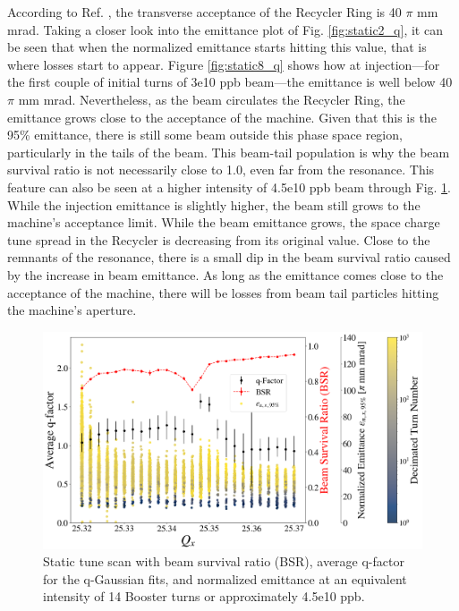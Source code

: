 According to Ref. \cite{rr0}, the transverse acceptance of the Recycler Ring is 40 $\pi$ mm mrad. Taking a closer look into the emittance plot of Fig. \ref{fig:static2_q}, it can be seen that when the normalized emittance starts hitting this value, that is where losses start to appear. Figure \ref{fig:static8_q} shows how at injection---for the first couple of initial turns of 3e10 ppb beam---the emittance is well below 40 $\pi$ mm mrad. Nevertheless, as the beam circulates the Recycler Ring, the emittance grows close to the acceptance of the machine. Given that this is the 95\% emittance, there is still some beam outside this phase space region, particularly in the tails of the beam. This beam-tail population is why the beam survival ratio is not necessarily close to 1.0, even far from the resonance. This feature can also be seen at a higher intensity of 4.5e10 ppb beam through Fig. \ref{fig:static14_q}. While the injection emittance is slightly higher, the beam still grows to the machine's acceptance limit. While the beam emittance grows, the space charge tune spread in the Recycler is decreasing from its original value. Close to the remnants of the resonance, there is a small dip in the beam survival ratio caused by the increase in beam emittance. As long as the emittance comes close to the acceptance of the machine, there will be losses from beam tail particles hitting the machine's aperture. 

\begin{figure}[H]
    \centering
    \includegraphics[width=\columnwidth]{chapter6/static14turns_emittance_dampersOFF.png}
    \caption{Static tune scan with beam survival ratio (BSR), average q-factor for the q-Gaussian fits, and normalized emittance at an equivalent intensity of 14 Booster turns or approximately 4.5e10 ppb.}
    \label{fig:static14_q}
   \vspace{-1.25em}
\end{figure}

